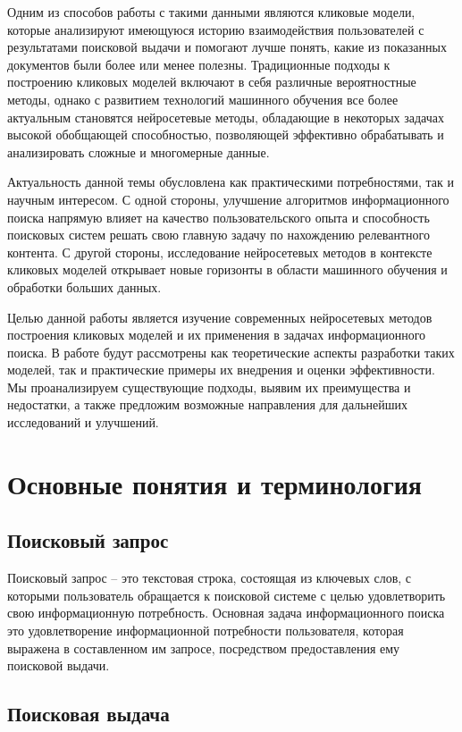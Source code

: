 \documentclass[diploma]{nanolab2015}
\begin{document}
Одним из способов работы с такими данными являются кликовые модели, которые анализируют имеющуюся историю взаимодействия пользователей с результатами поисковой выдачи и помогают лучше понять, какие из показанных документов были более или менее полезны. Традиционные подходы к построению кликовых моделей включают в себя различные вероятностные методы, однако с развитием технологий машинного обучения все более актуальным становятся нейросетевые методы, обладающие в некоторых задачах высокой обобщающей способностью, позволяющей эффективно обрабатывать и анализировать сложные и многомерные данные.

Актуальность данной темы обусловлена как практическими потребностями, так и научным интересом. С одной стороны, улучшение алгоритмов информационного поиска напрямую влияет на качество пользовательского опыта и способность поисковых систем решать свою главную задачу по нахождению релевантного контента. С другой стороны, исследование нейросетевых методов в контексте кликовых моделей открывает новые горизонты в области машинного обучения и обработки больших данных.

Целью данной работы является изучение современных нейросетевых методов построения кликовых моделей и их применения в задачах информационного поиска. В работе будут рассмотрены как теоретические аспекты разработки таких моделей, так и практические примеры их внедрения и оценки эффективности. Мы проанализируем существующие подходы, выявим их преимущества и недостатки, а также предложим возможные направления для дальнейших исследований и улучшений.
\newpage
\section{Основные понятия и терминология}
\subsection{Поисковый запрос}
Поисковый запрос -- это текстовая строка, состоящая из ключевых слов, с которыми пользователь обращается к поисковой системе с целью удовлетворить свою информационную потребность. Основная задача информационного поиска это удовлетворение информационной потребности пользователя, которая выражена в составленном им запросе, посредством предоставления ему поисковой выдачи.
\subsection{Поисковая выдача}
\end{document}
